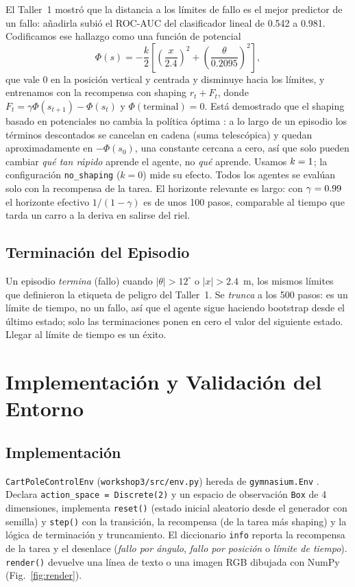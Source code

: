 \documentclass[conference]{IEEEtran}
\begin{document}
El Taller~1 mostró que la distancia a los límites de fallo es el mejor predictor de un
fallo: añadirla subió el ROC-AUC del clasificador lineal de 0.542 a 0.981. Codificamos ese
hallazgo como una función de potencial
\begin{equation}
\Phi(s) = -\frac{k}{2}\left[\left(\frac{x}{2.4}\right)^2 + \left(\frac{\theta}{0.2095}\right)^2\right],
\end{equation}
que vale 0 en la posición vertical y centrada y disminuye hacia los límites, y entrenamos
con la recompensa con shaping $r_t + F_t$, donde $F_t = \gamma\Phi(s_{t+1}) - \Phi(s_t)$ y
$\Phi(\text{terminal}) = 0$. Está demostrado que el shaping basado en potenciales no cambia
la política óptima \cite{ng1999}: a lo largo de un episodio los términos descontados se
cancelan en cadena (suma telescópica) y quedan aproximadamente en $-\Phi(s_0)$, una
constante cercana a cero, así que solo pueden cambiar \emph{qué tan rápido} aprende el
agente, no \emph{qué} aprende. Usamos $k = 1$; la configuración
\texttt{no\_shaping} ($k = 0$) mide su efecto. Todos los agentes se evalúan solo con la
recompensa de la tarea. El horizonte relevante es largo: con $\gamma = 0.99$ el
horizonte efectivo $1/(1-\gamma)$ es de unos 100 pasos, comparable al tiempo que tarda un
carro a la deriva en salirse del riel.

\subsection{Terminación del Episodio}
Un episodio \emph{termina} (fallo) cuando $|\theta| > 12^\circ$ o $|x| > 2.4$~m, los mismos
límites que definieron la etiqueta de peligro del Taller~1. Se \emph{trunca} a los 500
pasos: es un límite de tiempo, no un fallo, así que el agente sigue haciendo bootstrap
desde el último estado; solo las terminaciones ponen en cero el valor del siguiente estado.
Llegar al límite de tiempo es un éxito.

\section{Implementación y Validación del Entorno}

\subsection{Implementación}
\texttt{CartPoleControlEnv} (\texttt{workshop3/src/env.py}) hereda de
\texttt{gymnasium.Env} \cite{towers2024}. Declara \texttt{action\_space = Discrete(2)} y un
espacio de observación \texttt{Box} de 4 dimensiones, implementa \texttt{reset()} (estado
inicial aleatorio desde el generador con semilla) y \texttt{step()} con la transición, la
recompensa (de la tarea más shaping) y la lógica de terminación y truncamiento. El
diccionario \texttt{info} reporta la recompensa de la tarea y el desenlace (\emph{fallo por
ángulo}, \emph{fallo por posición} o \emph{límite de tiempo}). \texttt{render()} devuelve una
línea de texto o una imagen RGB dibujada con NumPy (Fig.~\ref{fig:render}).
\end{document}
